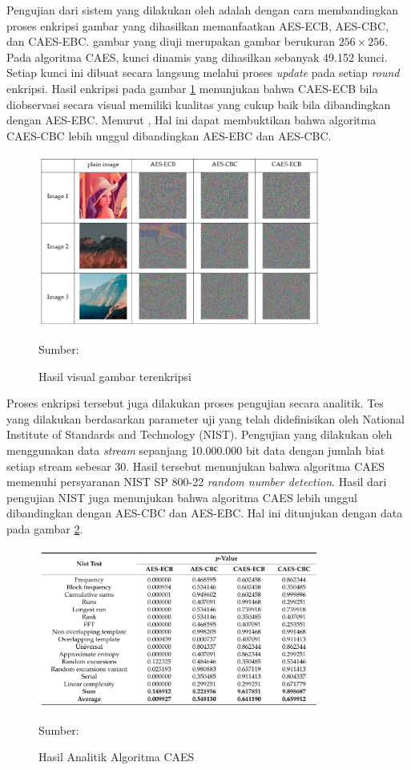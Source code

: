 Pengujian dari sistem yang dilakukan oleh \textcite{lin2021} adalah dengan cara membandingkan proses enkripsi gambar yang dihasilkan memanfaatkan AES-ECB, AES-CBC, dan CAES-EBC. gambar yang diuji merupakan gambar berukuran $256 \times 256$. Pada algoritma CAES, kunci dinamis yang dihasilkan sebanyak 49.152 kunci. Setiap kunci ini dibuat secara langsung melalui proses \emph{update} pada setiap \emph{round} enkripsi. Hasil enkripsi pada gambar \ref{fig:lin.result} menunjukan bahwa CAES-ECB bila diobservasi secara visual memiliki kualitas yang cukup baik bila dibandingkan dengan AES-EBC. Menurut \textcite{lin2021}, Hal ini dapat membuktikan bahwa algoritma CAES-CBC lebih unggul dibandingkan AES-EBC dan AES-CBC.

\begin{figure}[!h]
  \centering
  \includegraphics[width=350px]{chapters/res/chapter-2/img/lin.res.png}
  \caption{Hasil visual gambar terenkripsi} \label{fig:lin.result}
  Sumber: \textcite{lin2021}
\end{figure}

Proses enkripsi tersebut juga dilakukan proses pengujian secara analitik. Tes yang dilakukan berdasarkan parameter uji yang telah didefinisikan oleh National Institute of Standards and Technology (NIST). Pengujian yang dilakukan oleh \textcite{lin2021} menggunakan data \emph{stream} sepanjang 10.000.000 bit data dengan jumlah biat setiap stream sebesar 30. Hasil tersebut menunjukan bahwa algoritma CAES memenuhi persyaranan NIST SP 800-22 \emph{random number detection}. Hasil dari pengujian NIST juga menunjukan bahwa algoritma CAES lebih unggul dibandingkan dengan AES-CBC dan AES-EBC. Hal ini ditunjukan dengan data pada gambar \ref{fig:lin.analytic-result}.

\begin{figure}[!h]
  \centering
  \includegraphics[width=350px]{chapters/res/chapter-2/img/lin.analytic-test.png}
  \caption{Hasil Analitik Algoritma CAES} \label{fig:lin.analytic-result}
  Sumber: \textcite{lin2021}
\end{figure}

